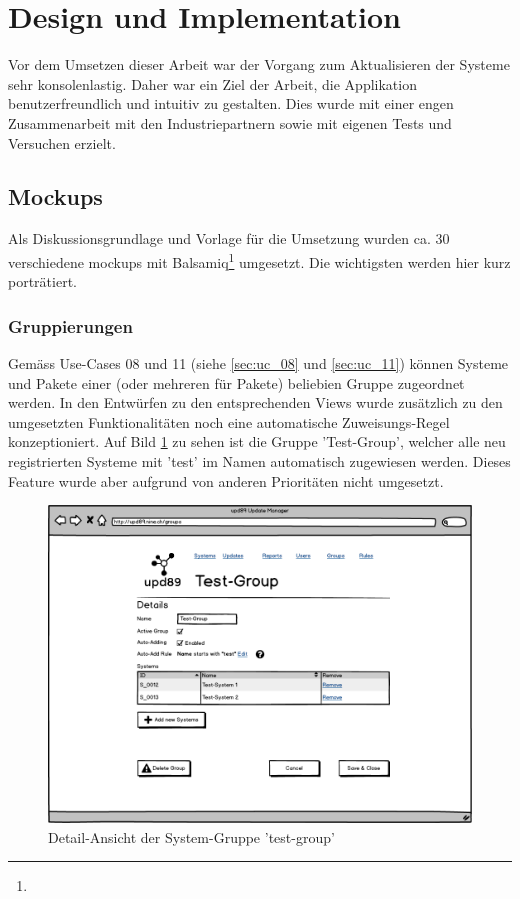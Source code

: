 \section{Design und Implementation}

Vor dem Umsetzen dieser Arbeit war der Vorgang zum Aktualisieren der Systeme sehr konsolenlastig. Daher war ein Ziel der Arbeit, die Applikation benutzerfreundlich und intuitiv zu gestalten. Dies wurde mit einer engen Zusammenarbeit mit den Industriepartnern sowie mit eigenen Tests und Versuchen erzielt.

\xxx

\subsection*{Mockups}

Als Diskussionsgrundlage und Vorlage für die Umsetzung wurden ca. 30 verschiedene \glspl{mockup} mit Balsamiq\footnote{} umgesetzt. Die wichtigsten werden hier kurz porträtiert.

\subsubsection*{Gruppierungen}

Gemäss Use-Cases 08 und 11 (siehe \ref{sec:uc_08} und \ref{sec:uc_11}) können Systeme und Pakete einer (oder mehreren für Pakete) beliebien Gruppe zugeordnet werden. In den Entwürfen zu den entsprechenden Views wurde zusätzlich zu den umgesetzten Funktionalitäten noch eine automatische Zuweisungs-Regel konzeptioniert. Auf Bild \ref{fig:design:group_systems_mockup} zu sehen ist die Gruppe 'Test-Group', welcher alle neu registrierten Systeme mit 'test' im Namen automatisch zugewiesen werden. Dieses Feature wurde aber aufgrund von anderen Prioritäten nicht umgesetzt.

\begin{figure}[H]
	\centering
	\includegraphics[width=\linewidth]{files/mockups/group_systems}
	\caption{Detail-Ansicht der System-Gruppe 'test-group'}
	\label{fig:design:group_systems_mockup}
\end{figure}

